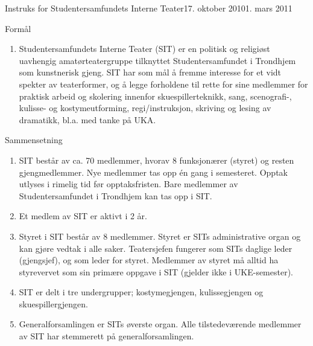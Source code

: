 \documentclass[../fsbok.tex]{subfiles}
\begin{document}
\begin{instruks}{Instruks for Studentersamfundets Interne Teater}{17. oktober 2010}{1. mars 2011 }

	\begin{instruksledd}{Formål}
		\begin{enumerate}
			\item Studentersamfundets Interne Teater (SIT) er en politisk og religiøst uavhengig
				amatørteatergruppe tilknyttet Studentersamfundet i Trondhjem som kunstnerisk gjeng. SIT har som mål
				å fremme interesse for et vidt spekter av teaterformer, og å legge forholdene til rette for sine
				medlemmer for praktisk arbeid og skolering innenfor skuespillerteknikk, sang, scenografi-, kulisse-
				og kostymeutforming, regi/instruksjon, skriving og lesing av dramatikk, bl.a. med tanke på UKA.
		\end{enumerate}
	\end{instruksledd}

	\begin{instruksledd}{Sammensetning}
		\begin{enumerate}
			\item SIT består av ca. 70 medlemmer, hvorav 8 funksjonærer (styret) og resten
				gjengmedlemmer. Nye medlemmer tas opp én gang i semesteret. Opptak utlyses i rimelig tid før
				opptaksfristen. Bare medlemmer av Studentersamfundet i Trondhjem kan tas opp i SIT.
			\item Et medlem av SIT er aktivt i 2 år.
			\item Styret i SIT består av 8 medlemmer. Styret er SITs administrative organ og kan
				gjøre vedtak i alle saker. Teatersjefen fungerer som SITs daglige leder (gjengsjef), og som leder
				for styret. Medlemmer av styret må alltid ha styrevervet som sin primære oppgave i SIT (gjelder ikke
				i UKE-semester).
			\item SIT er delt i tre undergrupper; kostymegjengen, kulissegjengen og
				skuespillergjengen.
			\item  Generalforsamlingen er SITs øverste organ. Alle tilstedeværende medlemmer
				av SIT har stemmerett på generalforsamlingen.
		\end{enumerate}
	\end{instruksledd}


\end{instruks}
\end{document}
